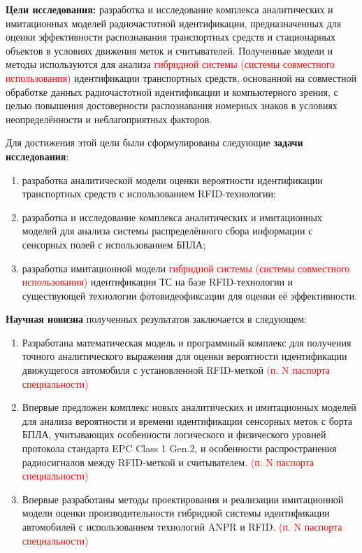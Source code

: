 \documentclass[12pt]{article}
\theoremstyle{definition}
\begin{document}
\textbf{Цели исследования:}
разработка и исследование комплекса аналитических и имитационных моделей радиочастотной идентификации, предназначенных для оценки эффективности распознавания транспортных средств и стационарных объектов в условиях движения меток и считывателей. Полученные модели и методы используются для анализа \textcolor{red}{гибридной системы (системы совместного использования)} идентификации транспортных средств, основанной на совместной обработке данных радиочастотной идентификации и компьютерного зрения, с целью повышения достоверности распознавания номерных знаков в условиях неопределённости и неблагоприятных факторов.


Для достижения этой цели были сформулированы следующие \textbf{задачи исследования}:

\begin{enumerate}
    \item разработка аналитической модели оценки вероятности идентификации транспортных средств с использованием RFID-технологии;
    \item разработка и исследование комплекса аналитических и имитационных моделей для анализа системы распределённого сбора информации с сенсорных полей с использованием БПЛА;
    \item разработка имитационной модели \textcolor{red}{гибридной системы (системы совместного использования)} идентификации ТС на базе RFID-технологии и существующей технологии фотовидеофиксации для оценки её эффективности.
\end{enumerate}

\textbf{Научная новизна} полученных результатов заключается в следующем:
\begin{enumerate}
    \item Разработана математическая модель и программный комплекс для получения точного аналитического выражения для оценки вероятности идентификации движущегося автомобиля с установленной RFID-меткой \textcolor{red}{(п. N паспорта специальности)}
    \item Впервые предложен комплекс новых аналитических и имитационных моделей для анализа вероятности и времени идентификации сенсорных меток с борта БПЛА, учитывающих особенности логического и физического уровней протокола стандарта EPC Class 1 Gen.2, и особенности распространения радиосигналов между RFID-меткой и считывателем. \textcolor{red}{(п. N паспорта специальности)}
    \item Впервые разработаны методы проектирования и реализации имитационной модели оценки производительности гибридной системы идентификации автомобилей с использованием технологий ANPR и RFID. \textcolor{red}{(п. N паспорта специальности)}
\end{enumerate}
\end{document}
